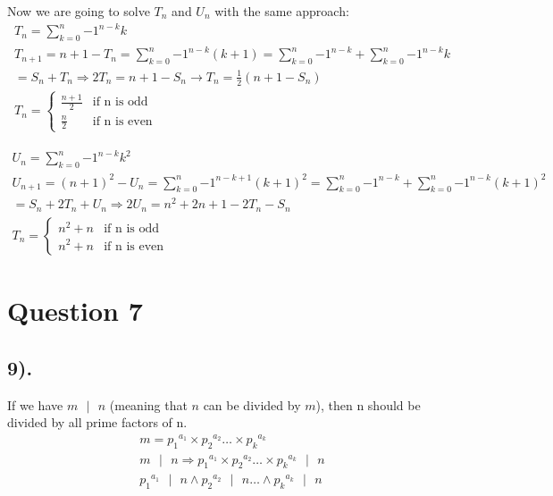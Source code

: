 \documentclass[12pt]{article}
\begin{document}
Now we are going to solve $T_{n}$ and $U_{n}$ with the same approach:
\begin{gather*}
    T_{n} = \sum_{k=0}^n {-1}^{n-k} k \\
    T_{n+1} = n + 1 - T_{n} = \sum_{k=0}^{n} {-1}^{n-k} (k+1) = \sum_{k=0}^n {-1}^{n-k} + \sum_{k=0}^n {-1}^{n-k} k \\
    = S_{n} + T_{n} \Rightarrow 2T_{n} = n + 1 - S_{n} \to T_{n} = \frac{1}{2} (n + 1 - S_{n}) \\
    T_{n} = \begin{cases} \frac{n+1}{2} & \text{if n is odd} \\ \frac{n}{2} & \text{if n is even} \end{cases}
\end{gather*}

\begin{gather*}
    U_{n} = \sum_{k=0}^n {-1}^{n-k} k^2 \\
    U_{n+1} = {(n + 1)}^2 - U_{n} = \sum_{k=0}^{n} {-1}^{n-k+1} {(k+1)}^2 = \sum_{k=0}^n {-1}^{n-k} + \sum_{k=0}^n {-1}^{n-k} {(k+1)}^2 \\
    = S_{n} + 2T_{n} + U_{n} \Rightarrow 2U_{n} = n^2 + 2n + 1 - 2T_{n} - S_{n} \\
    T_{n} = \begin{cases} n^2 + n & \text{if n is odd} \\ n^2 + n & \text{if n is even} \end{cases}
\end{gather*}

\section*{Question 7}
\subsection*{9).}
If we have $m\text{ $|$ }n$ (meaning that $n$ can be divided by $m$), then n should be divided by all prime factors of n.
\begin{gather*}
    m = {p_{1}}^{a_{1}} \times {p_{2}}^{a_{2}} \ldots \times {p_{k}}^{a_{k}} \\
    m \text{ $|$ } n \Rightarrow {p_{1}}^{a_{1}} \times {p_{2}}^{a_{2}} \ldots \times {p_{k}}^{a_{k}} \text{ $|$ } n \\
    {p_{1}}^{a_{1}} \text{ $|$ } n \wedge {p_{2}}^{a_{2}} \text{ $|$ } n \ldots \wedge {p_{k}}^{a_{k}} \text{ $|$ } n
\end{gather*}
\end{document}
